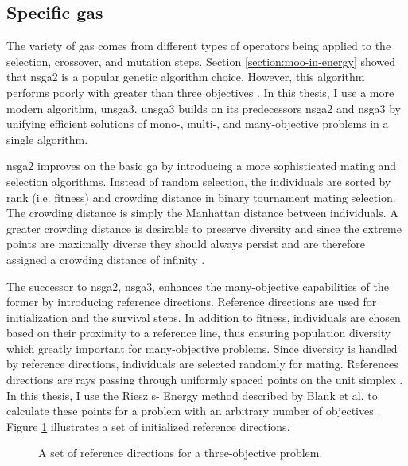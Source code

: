 \subsection{Specific \Aclp{ga}} The variety of \acp{ga} comes from different
types of operators being applied to the selection, crossover, and mutation
steps. Section \ref{section:moo-in-energy} showed that \ac{nsga2} is a popular
genetic algorithm choice. However, this algorithm performs poorly with greater
than three objectives \cite{deb_fast_2002, seada_unified_2016}. In this thesis,
I use a more modern algorithm, \ac{unsga3}. \ac{unsga3} builds on its
predecessors \ac{nsga2} and \ac{nsga3} by unifying efficient solutions of mono-,
multi-, and many-objective problems in a single algorithm.


\ac{nsga2} improves on the basic \ac{ga} by introducing a more sophisticated
mating and selection algorithms. Instead of random selection, the individuals
are sorted by rank (i.e. fitness) and crowding distance in binary tournament
mating selection. The crowding distance is simply the Manhattan distance between
individuals. A greater crowding distance is desirable to preserve diversity and
since the extreme points are maximally diverse they should always persist and
are therefore assigned a crowding distance of infinity \cite{deb_fast_2002}.

The successor to \ac{nsga2}, \ac{nsga3}, enhances the many-objective
capabilities of the former by introducing reference directions. Reference
directions are used for initialization and the survival steps. In addition to
fitness, individuals are chosen based on their proximity to a reference line,
thus ensuring population diversity which greatly important for many-objective
problems. Since diversity is handled by reference directions, individuals are
selected randomly for mating. References directions are rays passing through
uniformly spaced points on the unit simplex \cite{seada_unified_2016,
blank_generating_2021}. In this thesis, I use the Riesz s- Energy method
described by Blank et al. to calculate these points for a problem with an
arbitrary number of objectives \cite{blank_generating_2021}. Figure
\ref{fig:ref-dirs} illustrates a set of initialized reference directions.

\begin{figure}[h]
  \centering
  \resizebox{0.6\columnwidth}{!}{}
  \caption{A set of reference directions for a three-objective problem.}
  \label{fig:ref-dirs}
\end{figure}

